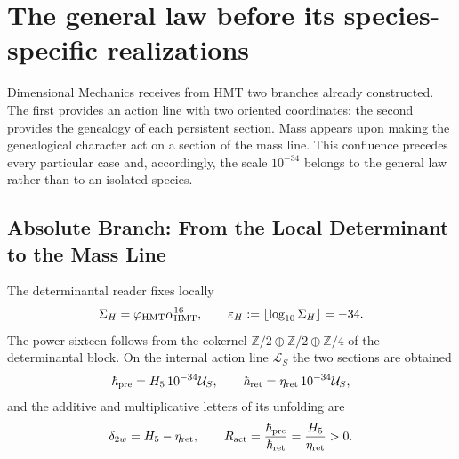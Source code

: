 \section{The general law before its species-specific realizations}
\label{sec:ley-general-masa-accion-autonoma}

Dimensional Mechanics receives from HMT two branches already constructed. The first
provides an action line with two oriented coordinates; the second
provides the genealogy of each persistent section. Mass appears upon
making the genealogical character act on a section of the mass line.
This confluence precedes every particular case and, accordingly, the
scale \(10^{-34}\) belongs to the general law rather than to an isolated species.

\subsection{Absolute Branch: From the Local Determinant to the Mass Line}

The determinantal reader fixes locally
\begin{equation}
 \Sigma_H=\varphi_{\rm HMT}\alpha_{\rm HMT}^{16},
 \qquad \varepsilon_H:=\left\lfloor\log_{10}\Sigma_H\right\rfloor=-34 .
 \label{eq:ley-masa-sigma-menos34-autonoma}
\end{equation}
The power sixteen follows from the cokernel
\(
 \mathbb Z/2\oplus\mathbb Z/2\oplus\mathbb Z/4
\)
of the determinantal block. On the internal action line
\(\mathcal L_S\) the two sections are obtained
\begin{equation}
 \boldsymbol\hbar_{\rm pre}
 =H_5\,10^{-34}\mathcal U_S,
 \qquad
 \boldsymbol\hbar_{\rm ret}
 =\eta_{\rm ret}\,10^{-34}\mathcal U_S,
 \label{eq:ley-masa-hbar-pre-ret-autonoma}
\end{equation}
and the additive and multiplicative letters of its unfolding are
\begin{equation}
 \delta_{2w}=H_5-\eta_{\rm ret},
 \qquad
 R_{\rm act}
 =\frac{\boldsymbol\hbar_{\rm pre}}
        {\boldsymbol\hbar_{\rm ret}}
 =\frac{H_5}{\eta_{\rm ret}}>0 .
 \label{eq:ley-masa-razon-accion-autonoma}
\end{equation}

